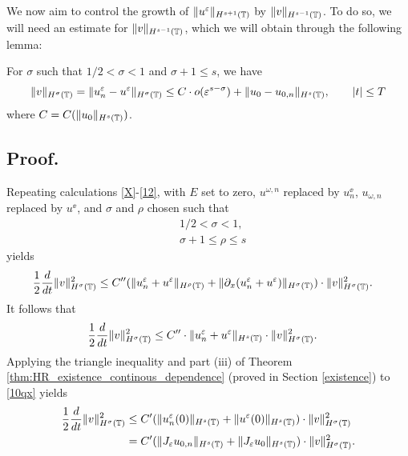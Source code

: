 	We now aim to control the growth of $\|u^\varepsilon\|_{H^{s+1}(\mathbb{T})}$ by
	$\|v\|_{H^{s-1}(\mathbb{T})}$. To do so, we will need an estimate for
	$\|v\|_{H^{s-1}(\mathbb{T})}$, which we will obtain through the following lemma:
%
%
%
%
\begin{lemma}
	\label{lem:left}
	For $\sigma$ such that $1/2 < \sigma < 1$ and $\sigma + 1 \le s$, we have
	\begin{equation}
	\label{lem6rq}
	\begin{split}
		\|v\|_{H^{\sigma}(\mathbb{T})} = 
		\|u^\varepsilon_n - u^\varepsilon\|_{H^\sigma(\mathbb{T})}
		\le C \cdot o(\varepsilon^{s- \sigma }) + \|u_0 - u_{0,n} \|_{H^s(\mathbb{T})}, \qquad |t| \le T
	\end{split}
\end{equation}
where $C=C(\|u_0\|_{H^s(\mathbb{T})})$.
\end{lemma}
%
%
%
\subsection{ Proof.}
Repeating calculations \eqref{X}-\eqref{12}, with $E$ set to zero, $u^{\omega,n}$
replaced by $u^\ee_n$, $u_{\omega,n}$ replaced by $u^\ee$, and $\sigma$ and $\rho$ chosen such that
\begin{equation}
	\label{size_of_sigma'}
	\begin{split}
	& 1/2 < \sigma < 1,
	\\
	& \sigma + 1 \le \rho \le s 
	\end{split}
\end{equation}
yields
 \begin{equation*}
	\begin{split}
		\frac{1}{2}\frac{d}{dt} \|v\|_{H^\sigma(\mathbb{T})}^2
		& \le
		C'' (\|u^{\varepsilon}_n + u^\varepsilon \|_{H^{\rho}(\mathbb{T})} +
		\|\partial_x(u^{\varepsilon}_n + u^\varepsilon) \|_{H^\sigma(\mathbb{T})})
		\cdot \|v\|_{H^\sigma(\mathbb{T})}^2.
	\end{split}
\end{equation*}
\medskip
It follows that 
\begin{equation}
	\begin{split}
		\frac{1}{2}\frac{d}{dt} \|v\|_{H^{\sigma}(\mathbb{T})}^2
		& \le
		C'' \cdot \|u^{\varepsilon}_n
		+ u^\varepsilon\|_{H^{s}(\mathbb{T})}\cdot \|v\|_{H^{\sigma}(\mathbb{T})}^2.
		\label{10qx}
	\end{split}
\end{equation}
Applying the triangle inequality and
part (iii) of Theorem \ref{thm:HR_existence_continous_dependence} (proved in
Section \ref{existence})
to \eqref{10qx} yields
%
\begin{equation}
	\begin{split}
		\label{11qx}
		\frac{1}{2}\frac{d}{dt} \|v\|_{H^{\sigma}(\mathbb{T})}^2
		& \le
		C' (\|u^{\varepsilon}_n(0)\|_{H^{s}(\mathbb{T})}
		+ \|u^\varepsilon(0)\|_{H^{s}(\mathbb{T})})\cdot \|v\|_{H^{\sigma}(\mathbb{T})}^2
		\\
		& = C' (\|J_\varepsilon u_{0,n}\|_{H^{s}(\mathbb{T})}
		+ \|J_\varepsilon u_0\|_{H^{s}(\mathbb{T})})\cdot \|v\|_{H^{\sigma}(\mathbb{T})}^2.
	\end{split}
\end{equation}
